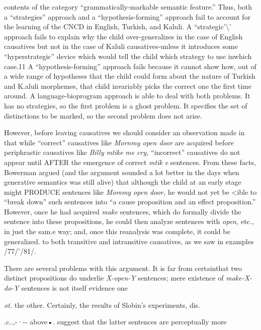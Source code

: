 contents of the category ``grammatically-markable semantic feature.'' Thus, both a ``strategies'' approach and a ``hypothesis-forming''
approach fail to account for the learning of the CNCD in English,
Turkish, and Kaluli. A ``strategic'{\textbackslash}' approach fails to explain why the
child over-generalizes in the case of English causatives but not in the case of Kaluli causatives{}-unless it introduces some ``hyperstrategic'' device which would tell the child which strategy to use inwhich case.11 A ``hypothesis-forming'' approach fails because it cannot show how, out of a wide range of hypotheses that the child could form about the nature of Turkish and K.aluli morphemes, that child invariably picks the correct one the first time around. A language-bioprogram approach is able to deal with both problems. It has no strategies, so the first problem is a ghost problem. It specifies the set of distinctions to be marked, so the second problem does not arise.

However, before leaving causatives we should consider an obser\-vation made in \citet{Bowerman1974} that while ``correct'' causatives like \textit{Mornmy open door }are acquired before periphrastic causatives like \textit{Billy }\textit{mtike} \textit{me} \textit{cry,} ``incorrect'' causatives do not appear until AFTER the emergence of correct \textit{mtik} \textit{e} sentences. From these facts, Bowerman argued (and the argument sounded a lot better in the days when genera\-tive semantics was still alive) that although the child at an early stage might PRODUCE sentences like \textit{Mommy open door, }he would not yet be {\textless}ible to ``break down'' such sentences into ``a cause proposition and an effect proposition.'' However, once he had acquired \textit{make} sentences, which do formally divide the sentence into these proposi\-tions, he could then analyze sentences with \textit{open, }etc., in just the sam.e way; and, once this reanalysis was complete, it could be generalized. to both transitive and intransitive causatives, as we saw in examples
/77/'/81/.

There are several problems with this argument. It is far from certainthat two distinct propositions do underlie \textit{X-open-Y }sentences; mere existence of \textit{make-X-do-Y }sentences is not itself evidence one

\textit{ot.} the other. Certainly, the results of Slobin's experiments, dis.

.c..,-·-{}- above•. suggest that the latter sentences are perceptually more

